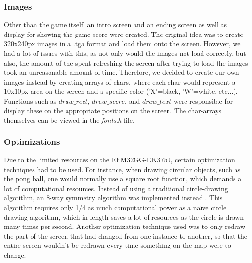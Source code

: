 \subsubsection{Images}

Other than the game itself, an intro screen and an ending screen as well as display for showing the game score were created. The original idea was to create 320x240px images in a .tga format and load them onto the screen. However, we had a lot of issues with this, as not only would the images not load correctly, but also, the amount of the spent refreshing the screen after trying to load the images took an unreasonable amount of time. Therefore, we decided to create our own images instead by creating arrays of chars, where each char would represent a 10x10px area on the screen and a specific color ('X'=black, 'W'=white, etc...). Functions such as \emph{$draw\_rect$}, \emph{$draw\_score$}, and \emph{$draw\_text$} were responsible for display these on the appropriate positions on the screen. The char-arrays themselves can be viewed in the \emph{fonts.h}-file.


\subsubsection{Optimizations}

Due to the limited resources on the EFM32GG-DK3750, certain optimization techniques had to be used. For instance, when drawing circular objects, such as the pong ball, one would normally use a square root function, which demands a lot of computational resources. Instead of using a traditional circle-drawing algorithm, an 8-way symmetry algorithm was implemented instead \cite{circle-algorithm}. This algorithm requires only 1/4 as much computational power as a naïve circle drawing algorithm, which in length saves a lot of resources as the circle is drawn many times per second.
	Another optimization technique used was to only redraw the part of the screen that had changed from one instance to another, so that the entire screen wouldn't be redrawn every time something on the map were to change.  

